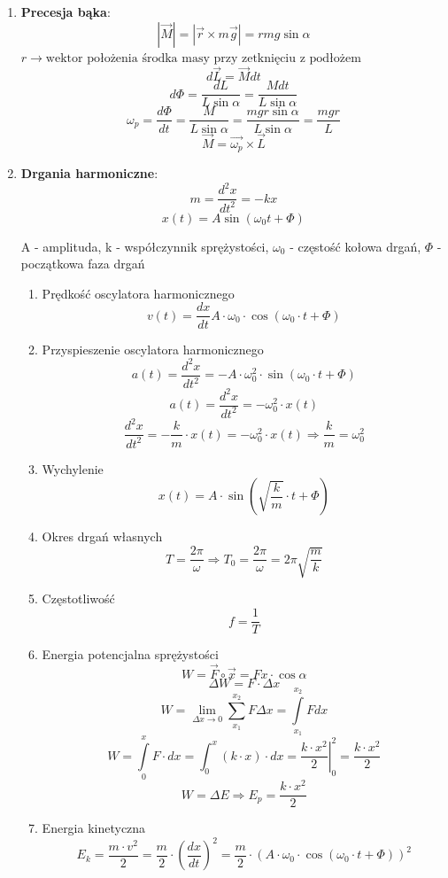 \documentclass{article}
\begin{document}
\begin{enumerate}
		\item \textbf{Precesja bąka}:
		\[
		| \vec{M} | = | \vec{r} \times m \vec{g} | = rmg \sin \alpha
		\]
		$
		r \longrightarrow \text{wektor położenia środka masy przy zetknięciu z podłożem}
		$
		\[
		d \vec{L} = \vec{M} dt
		\]
		\[
		d \varPhi = \frac{dL}{L \sin\alpha} = \frac{Mdt}{L \sin \alpha}
		\]
		\[
		\omega_p = \frac{d \varPhi}{dt} = \frac{M}{L \sin \alpha} = \frac{mgr \sin \alpha}{L \sin \alpha} = \frac{mgr}{L}
		\]
		\[
		\vec{M} = \vec{\omega_p} \times \vec{L}
		\]
		
		\item \textbf{Drgania harmoniczne}:
		\[
		m = \frac{d^2x}{dt^2} = -kx
		\]
		\[
		x(t) = A \sin (\omega_0t + \varPhi)
		\]
		
		A - amplituda, k - współczynnik sprężystości, $\omega_0$ - częstość
		kołowa drgań, $\varPhi$ - początkowa faza drgań
		\begin{enumerate}
			\item Prędkość oscylatora harmonicznego
			\[
			v(t) = \frac{dx}{dt} A \cdot \omega_0 \cdot \cos(\omega_0 \cdot t + \varPhi)
			\]
			\item Przyspieszenie oscylatora harmonicznego
			\[
			a(t) = \frac{d^2 x}{dt^2} = -A \cdot \omega_0^2 \cdot \sin(\omega_0 \cdot t + \varPhi)
			\]
			\[
			a(t) = \frac{d^2x}{dt^2} = -\omega_0^2 \cdot x(t)
			\]
			\[
			\frac{d^2 x}{dt^2} = - \frac{k}{m} \cdot x(t) = - \omega^2_0 \cdot x(t) \Rightarrow \frac{k}{m} = \omega_0^2
			\]
			\item Wychylenie
			\[
			x(t) = A \cdot \sin \left(\sqrt{\frac{k}{m}} \cdot t + \varPhi \right)
			\]
			\item Okres drgań własnych
			\[
			T = \frac{2 \pi}{\omega} \Longrightarrow T_0 = \frac{2 \pi}{\omega} = 2 \pi \sqrt{\frac{m}{k}}
			\]
			\item Częstotliwość
			\[
			f = \frac{1}{T}
			\]
			\item Energia potencjalna sprężystości
			\[
			W = \vec{F} \circ \vec{x} = Fx \cdot \cos \alpha
			\]
			\[
			\Delta W = F \cdot \Delta x
			\]
			\[
			W = \lim\limits_{\Delta x \rightarrow 0} \sum\limits_{x_1}^{x_2} F \Delta x = \int\limits_{x_1}^{x_2} Fdx
			\]
			\[
			W = \int\limits_0^x F \cdot dx = \int_0^x (k \cdot x) \cdot dx = \left. \frac{k \cdot x^2}{2} \right|_0^2 = \frac{k \cdot x^2}{2}
			\]
			\[
			W = \Delta E \Rightarrow E_p = \frac{k \cdot x^2}{2}
			\]
			\item Energia kinetyczna
			\[
			E_k = \frac{m \cdot v^2}{2} = \frac{m}{2} \cdot \left( \frac{dx}{dt} \right)^2 = \frac{m}{2} \cdot (A \cdot \omega_0 \cdot \cos(\omega_0 \cdot t + \varPhi))^2 
\]
\end{enumerate}
\end{enumerate}
\end{document}
